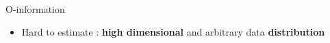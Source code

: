 \begin{frame}{O-information}
\begin{itemize}

    \item Hard to estimate :
    \textbf{high dimensional} and arbitrary data \textbf{distribution}
\end{itemize}

\end{frame}






%     




